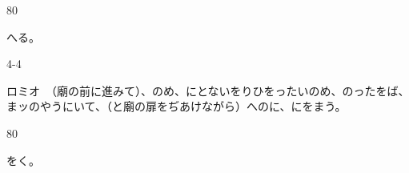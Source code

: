 \documentclass[tate,paper=b6j,jafontsize=9pt]{jlreq}
\begin{document}
\begin{azconvIndented}{8\zw}{0\zw}

へる。

\end{azconvIndented}
\begin{azconvIndented}{4\zw}{-4\zw}

ロミオ　（廟の前に進みて）、のめ、にとないをりひをったいのめ、のったをば、まッのやうにいて、（と廟の扉をぢあけながら）へのに、にをまう。

\end{azconvIndented}
\begin{azconvIndented}{8\zw}{0\zw}

をく。

\end{azconvIndented}
\end{document}

